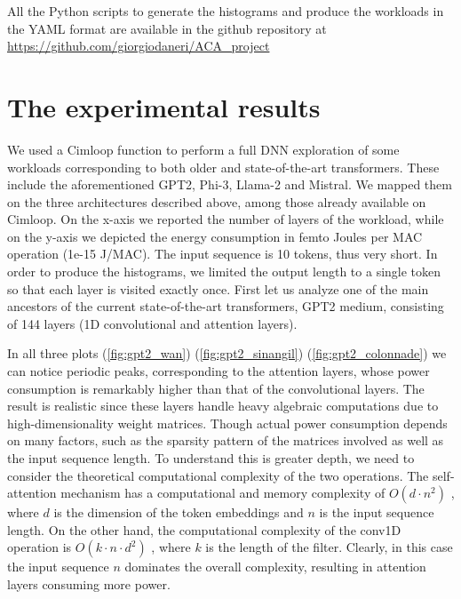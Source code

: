 \documentclass[conference]{IEEEtran}
\begin{document}
All the Python scripts to generate the histograms and produce the workloads in the YAML format are available in the github repository at \hyperlink{this link}{https://github.com/giorgiodaneri/ACA\_project}

\section{The experimental results}
We used a Cimloop function to perform a full DNN exploration of some workloads corresponding to both older and state-of-the-art transformers. These include the aforementioned GPT2, Phi-3, Llama-2 and Mistral. We mapped them on the three architectures described above, among those already available on Cimloop. 
On the x-axis we reported the number of layers of the workload, while on the y-axis we depicted the energy consumption in femto Joules per MAC operation (1e-15 J/MAC). The input sequence is 10 tokens, thus very short. In order to produce the histograms, we limited the output length to a single token so that each layer is visited exactly once.
First let us analyze one of the main ancestors of the current state-of-the-art transformers, GPT2 medium, consisting of 144 layers (1D convolutional and attention layers). 

In all three plots (\ref{fig:gpt2_wan}) (\ref{fig:gpt2_sinangil}) (\ref{fig:gpt2_colonnade}) we can notice periodic peaks, corresponding to the attention layers, whose power consumption is remarkably higher than that of the convolutional layers. The result is realistic since these layers handle heavy algebraic computations due to high-dimensionality weight matrices. Though actual power consumption depends on many factors, such as the sparsity pattern of the matrices involved as well as the input sequence length. To understand this is greater depth, we need to consider the theoretical computational complexity of the two operations. The self-attention mechanism has a computational and memory complexity of $O(d \cdot n^2)$ \cite{fournier2023practical}, where $d$ is the dimension of the token embeddings and $n$ is the input sequence length. On the other hand, the computational complexity of the conv1D operation is $O(k \cdot n \cdot d^2)$ \cite{NIPS2017_3f5ee243}, where $k$ is the length of the filter. Clearly, in this case the input sequence $n$ dominates the overall complexity, resulting in attention layers consuming more power. \\
\end{document}
